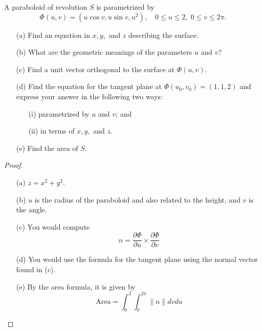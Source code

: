 \documentclass[openany]{book}
\begin{document}
\begin{prob}[16]
    A paraboloid of revolution \( S \) is parametrized by 
    \[
    \Phi(u, v) = (u \cos v, u \sin v, u^2), \quad 0 \leq u \leq 2, \; 0 \leq v \leq 2\pi.
    \]
    
    \begin{enumerate}
        \item[(a)] Find an equation in \( x, y, \) and \( z \) describing the surface.
        \item[(b)] What are the geometric meanings of the parameters \( u \) and \( v \)?
        \item[(c)] Find a unit vector orthogonal to the surface at \( \Phi(u, v) \).
        \item[(d)] Find the equation for the tangent plane at \( \Phi(u_0, v_0) = (1, 1, 2) \) and express your answer in the following two ways:
        
        \begin{enumerate}
            \item[(i)] parametrized by \( u \) and \( v \); and
            \item[(ii)] in terms of \( x, y, \) and \( z \).
        \end{enumerate}
        
        \item[(e)] Find the area of \( S \).
    \end{enumerate}
\end{prob}
\begin{proof}
    \begin{enumerate}
        \item[(a)] $z=x^2+y^2$.
        \item[(b)] $u$ is the radius of the paraboloid and also related to the height, and $v$ is the angle.
        \item[(c)] You would compute 
        \begin{equation*}
            n=\frac{\partial\Phi}{\partial u}\times\frac{\partial\Phi}{\partial v}
        \end{equation*}
        \item[(d)] You would use the formula for the tangent plane using the normal vector found in (c).
        \item[(e)] By the area formula, it is given by 
        \begin{equation*}
            \text{Area}=\int_0^2\int_0^{2\pi}\|n\| dvdu
        \end{equation*}
    \end{enumerate}
\end{proof}
\end{document}
